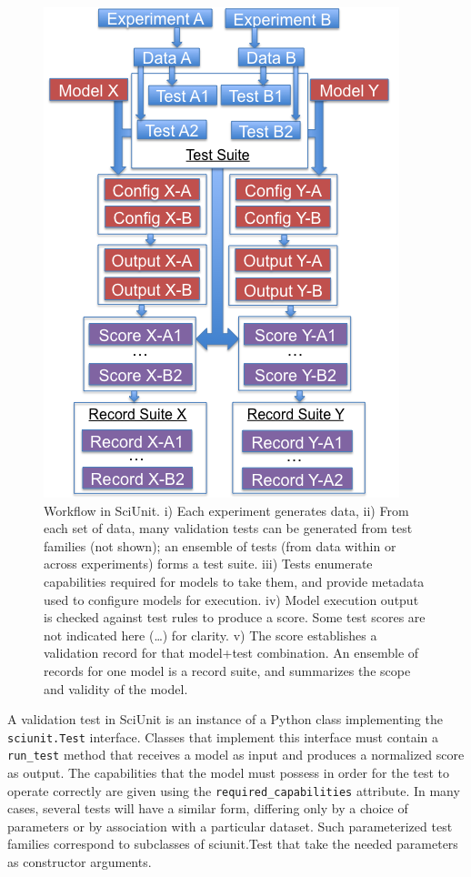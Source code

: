 \documentclass[a4paper,12pt]{article}
\begin{document}
\begin{figure}
\includegraphics[scale=0.5]{sciunit_flowchart.png}
\caption{Workflow in SciUnit. \scriptsize{i) Each experiment generates data, ii) From each set of data, many validation tests can be generated from test families (not shown); an ensemble of tests (from data within or across experiments) forms a test suite.  iii) Tests enumerate capabilities required for models to take them, and provide metadata used to configure models for execution.  iv) Model execution output is checked against test rules to produce a score.  Some test scores are not indicated here (…) for clarity.  v) The score establishes a validation record for that model+test combination.  An ensemble of records for one model is a record suite, and summarizes the scope and validity of the model.}}
\label{fig:sciunit_flowchart}
\end{figure}

A validation test in SciUnit is an instance of a Python class implementing the \verb|sciunit.Test| interface. Classes that implement this interface must contain a \verb|run_test| method that receives a model as input and produces a normalized score as output. The capabilities that the model must possess in order for the test to operate correctly are given using the \verb|required_capabilities| attribute. In many cases, several tests will have a similar form, differing only by a choice of parameters or by association with a particular dataset. Such parameterized test families correspond to subclasses of sciunit.Test that take the needed parameters as constructor arguments. 
\end{document}
